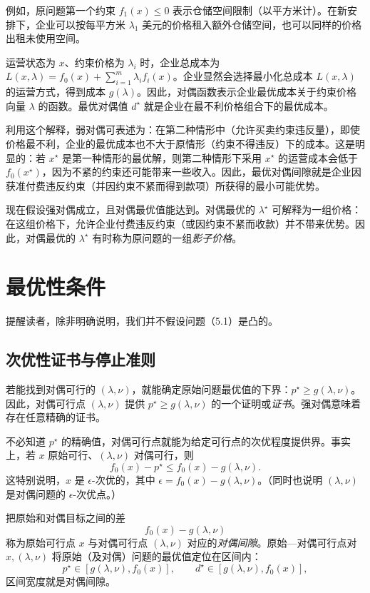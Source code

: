 例如，原问题第一个约束 $f_1(x)\le0$ 表示仓储空间限制（以平方米计）。在新安排下，企业可以按每平方米 $\lambda_1$ 美元的价格租入额外仓储空间，也可以同样的价格出租未使用空间。

运营状态为 $x$、约束价格为 $\lambda_i$ 时，企业总成本为
$L(x,\lambda)=f_0(x)+\sum_{i=1}^m\lambda_i f_i(x)$。企业显然会选择最小化总成本 $L(x,\lambda)$ 的运营方式，得到成本 $g(\lambda)$。因此，对偶函数表示企业最优成本关于约束价格向量 $\lambda$ 的函数。最优对偶值 $d^\star$ 就是企业在最不利价格组合下的最优成本。

利用这个解释，弱对偶可表述为：在第二种情形中（允许买卖约束违反量），即使价格最不利，企业的最优成本也不大于原情形（约束不得违反）下的成本。这是明显的：若 $x^\star$ 是第一种情形的最优解，则第二种情形下采用 $x^\star$ 的运营成本会低于 $f_0(x^\star)$，因为不紧的约束还可能带来一些收入。因此，最优对偶间隙就是企业因获准付费违反约束（并因约束不紧而得到款项）所获得的最小可能优势。

现在假设强对偶成立，且对偶最优值能达到。对偶最优的 $\lambda^\star$ 可解释为一组价格：在这组价格下，允许企业付费违反约束（或因约束不紧而收款）并不带来优势。因此，对偶最优的 $\lambda^\star$ 有时称为原问题的一组\emph{影子价格}。

\section{最优性条件}
提醒读者，除非明确说明，我们并不假设问题（5.1）是凸的。

\subsection{次优性证书与停止准则}
若能找到对偶可行的 $(\lambda,\nu)$，就能确定原始问题最优值的下界：$p^\star\ge g(\lambda,\nu)$。因此，对偶可行点 $(\lambda,\nu)$ 提供 $p^\star\ge g(\lambda,\nu)$ 的一个证明或\emph{证书}。强对偶意味着存在任意精确的证书。

不必知道 $p^\star$ 的精确值，对偶可行点就能为给定可行点的次优程度提供界。事实上，若 $x$ 原始可行、$(\lambda,\nu)$ 对偶可行，则
\[
f_0(x)-p^\star\le f_0(x)-g(\lambda,\nu).
\]
这特别说明，$x$ 是 $\epsilon$-次优的，其中 $\epsilon=f_0(x)-g(\lambda,\nu)$。（同时也说明 $(\lambda,\nu)$ 是对偶问题的 $\epsilon$-次优点。）

把原始和对偶目标之间的差
\[
f_0(x)-g(\lambda,\nu)
\]
称为原始可行点 $x$ 与对偶可行点 $(\lambda,\nu)$ 对应的\emph{对偶间隙}。原始—对偶可行点对 $x,(\lambda,\nu)$ 将原始（及对偶）问题的最优值定位在区间内：
\[
p^\star\in[g(\lambda,\nu),f_0(x)],\qquad
d^\star\in[g(\lambda,\nu),f_0(x)],
\]
区间宽度就是对偶间隙。

